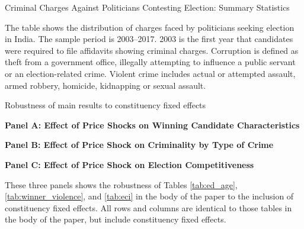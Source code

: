 \begin{table}[H]\caption{Criminal Charges Against Politicians
    Contesting Election: \cnewline Summary Statistics}
  \begin{center}
  
  \end{center}
  \label{tab:pol_crimes}
  
  \footnotesize{The table shows the distribution of charges faced by
    politicians seeking election in India. The sample period is
    2003--2017. 2003 is the first year that candidates were required
    to file affidavits showing criminal charges.  Corruption is
    defined as theft from a government office, illegally attempting to
    influence a public servant or an election-related crime. Violent
    crime includes actual or attempted assault, armed robbery,
    homicide, kidnapping or sexual assault.}
\end{table}


\begin{table}[H]\caption{Robustness of main results to constituency
    fixed effects}
  \vspace{1cm}
  \small
  \textbf{Panel A: Effect of Price Shocks on Winning Candidate Characteristics}
  
  \newline
  \small \textbf{Panel B: Effect of Price Shock on Criminality by Type
    of Crime}
  
  \newline
  \small \textbf{Panel C: Effect of Price Shock on Election Competitiveness}
  

  \label{tab:con_fe}
  \footnotesize{These three panels shows the robustness of Tables
    \ref{tab:ed_age}, \ref{tab:winner_violence}, and \ref{tab:eci} in
    the body of the paper to the inclusion of constituency fixed
    effects. All rows and columns are identical to those tables in the
    body of the paper, but include constituency fixed effects.} \small
\end{table}

